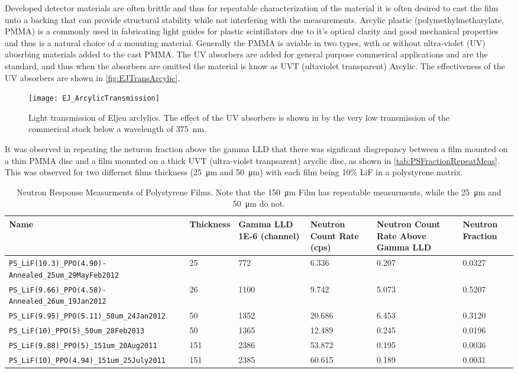 \documentclass[draftcls,onecolumn]{IEEEtran}
\begin{document}
Developed detector materials are often brittle and thus for repeatable characterization of the material it is often desired to cast the film unto a backing that can provide structural stability while not interfering with the measurements.
Arcylic plastic (polymethylmetharylate, PMMA) is a commonly used in fabricating light guides for plastic scintillators due to it's optical clarity and good mechanical properties and thus is a natural choice of a mounting material.
Generally the PMMA is aviable in two types, with or without ultra-violet (UV) abosrbing materials added to the cast PMMA.
The UV absorbers are added for general purpose commerical applications and are the standard, and thus when the absorbers are omitted the material is know as UVT (ultaviolet transparent) Arcylic.
The effectiveness of the UV absorbers are shown in \autoref{fig:EJTransArcylic}.
\begin{figure}
  \centering
  \texttt{[image: EJ\_ArcylicTransmission]}
	\caption[Light Transmission of Eljen Arcylics (Eljen)]{Light transmission of Eljen arclylics.  The effect of the UV absorbers is shown in by the very low transmission of the commerical stock below a wavelength of \SI{375}{\nm}.}
	\label{fig:EJTransArcylic}
\end{figure}	
It was observed in repeating the neturon fraction above the gamma LLD that there was signficant disgrepancy between a film mounted on a thin PMMA disc and a film mounted on a thick UVT (ultra-violet tranpsarent) aryclic disc, as shown in \autoref{tab:PSFractionRepeatMeas}.
This was observed for two differnet films thickness (\SI{25}{\um} and \SI{50}{\um}) with each film being 10\% LiF in a polystyrene matrix.
\begin{table}
	\centering
	\caption[PS Film Neutron Fraction Measurments]{Neutron Response Measurments of Polystyrene Films.  Note that the \SI{150}{\um} Film has repeatable measurments, while the \SI{25}{\um} and \SI{50}{\um} do not.}
	\label{tab:PSFractionRepeatMeas}
\begin{tabular}{m{2cm} | m{1cm} m{1.5cm} m{1.5cm} m{2cm} m{2cm}}
Name&Thickness&Gamma LLD \num{1E-6} (channel) & Neutron Count Rate (cps) & Neutron Count Rate Above Gamma LLD & Neutron Fraction\\
\hline
\hline
\verb+PS_LiF(10.3)_PPO(4.90)-Annealed_25um_29MayFeb2012+ & 25 & 772&6.336&0.207&0.0327 \\
\verb+PS_LiF(9.66)_PPO(4.58)-Annealed_26um_19Jan2012+    & 26&1100&9.742&5.073&0.5207 \\
\hline
\verb+PS_LiF(9.95)_PPO(5.11)_50um_24Jan2012+             &50&1352&20.686&6.453&0.3120 \\
\verb+PS_LiF(10)_PPO(5)_50um_28Feb2013+		  &50&1365&12.489&0.245&0.0196 \\
\hline
\verb+PS_LiF(9.88)_PPO(5)_151um_20Aug2011+	          &151&2386&53.872&0.195&0.0036 \\
\verb+PS_LiF(10)_PPO(4.94)_151um_25July2011+	          &151&2385&60.615&0.189&0.0031 \\
\end{tabular}
\end{table}
\end{document}
